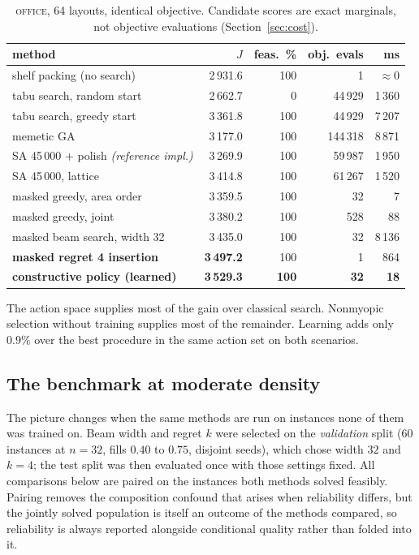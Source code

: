 \documentclass[preprint,12pt,authoryear]{elsarticle}
\begin{document}
\begin{table}[t]
\centering
\caption{\textsc{office}, 64 layouts, identical objective. Candidate scores are
exact marginals, not objective evaluations (Section~\ref{sec:cost}).}
\label{tab:main}
\small
\setlength{\tabcolsep}{4pt}
\begin{tabular}{@{}lrrrr@{}}
\toprule
method & $J$ & feas.\ \% & obj.\ evals & ms \\
\midrule
shelf packing (no search)                & 2\,931.6 & 100 & 1 & $\approx$0 \\
tabu search, random start                & 2\,662.7 & 0   & 44\,929 & 1\,360 \\
tabu search, greedy start                & 3\,361.8 & 100 & 44\,929 & 7\,207 \\
memetic GA                               & 3\,177.0 & 100 & 144\,318 & 8\,871 \\
SA 45\,000 $+$ polish \emph{(reference impl.)} & 3\,269.9 & 100 & 59\,987 & 1\,950 \\
SA 45\,000, lattice                      & 3\,414.8 & 100 & 61\,267 & 1\,520 \\
\midrule
masked greedy, area order                & 3\,359.5 & 100 & 32 & 7 \\
masked greedy, joint                     & 3\,380.2 & 100 & 528 & 88 \\
masked beam search, width 32             & 3\,435.0 & 100 & 32 & 8\,136 \\
\textbf{masked regret 4 insertion}       & \textbf{3\,497.2} & 100 & 1 & 864 \\
\midrule
\textbf{constructive policy (learned)}   & \textbf{3\,529.3} & \textbf{100} & \textbf{32} & \textbf{18} \\
\bottomrule
\end{tabular}
\end{table}

The action space supplies most of the gain over classical search. Nonmyopic
selection without training supplies most of the remainder. Learning adds only $0.9\%$
over the best procedure in the same action set on both scenarios.

\subsection{The benchmark at moderate density}
\label{sec:results_bench}
The picture changes when the same methods are run on instances none of them was
trained on. Beam width and regret $k$ were selected on the \emph{validation}
split ($60$ instances at $n=32$, fills $0.40$ to $0.75$, disjoint seeds), which
chose width $32$ and $k=4$; the test split was then evaluated once with those
settings fixed. All comparisons below are paired on the instances both methods
solved feasibly. Pairing removes the composition confound that arises when
reliability differs, but the jointly solved population is itself an outcome of
the methods compared, so reliability is always reported alongside conditional
quality rather than folded into it.
\end{document}

